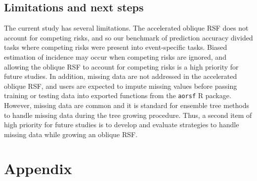 \documentclass[twoside,11pt]{article}\usepackage[]{graphicx}\usepackage[]{xcolor}
\begin{document}
\subsection{Limitations and next steps}

The current study has several limitations. The accelerated oblique RSF does not account for competing risks, and so our benchmark of prediction accuracy divided tasks where competing risks were present into event-specific tasks. Biased estimation of incidence may occur when competing risks are ignored, and allowing the oblique RSF to account for competing risks is a high priority for future studies. In addition, missing data are not addressed in the accelerated oblique RSF, and users are expected to impute missing values before passing training or testing data into exported functions from the \texttt{aorsf} R package. However, missing data are common and it is standard for ensemble tree methods to handle missing data during the tree growing procedure. Thus, a second item of high priority for future studies is to develop and evaluate strategies to handle missing data while growing an oblique RSF.




\newpage

\appendix

\section*{Appendix}
\captionsetup{labelformat=AppendixTables}
\setcounter{table}{0}
\end{document}
